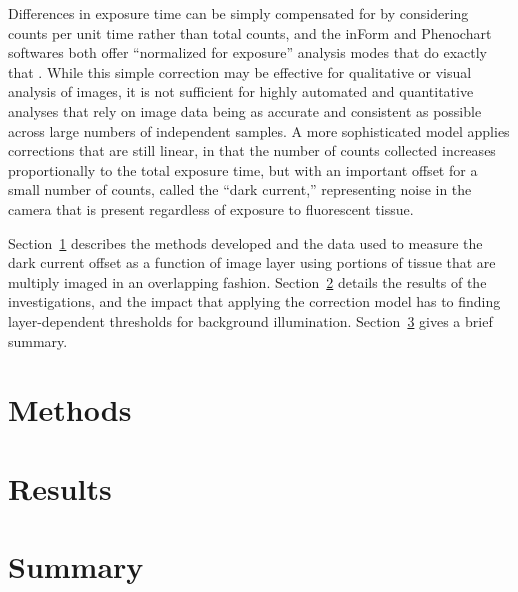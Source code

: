 \documentclass[letterpaper,11pt]{article}
\newcommand{\refsec}[1]{Section~\ref{#1}}
\begin{document}
Differences in exposure time can be simply compensated for by considering counts per unit time rather than total counts, and the inForm and Phenochart softwares both offer ``normalized for exposure'' analysis modes that do exactly that \cite{inform_user_manual,phenochart_user_manual}. While this simple correction may be effective for qualitative or visual analysis of images, it is not sufficient for highly automated and quantitative analyses that rely on image data being as accurate and consistent as possible across large numbers of independent samples. A more sophisticated model applies corrections that are still linear, in that the number of counts collected increases proportionally to the total exposure time, but with an important offset for a small number of counts, called the ``dark current,'' representing noise in the camera that is present regardless of exposure to fluorescent tissue. 

\refsec{sec:methods} describes the methods developed and the data used to measure the dark current offset as a function of image layer using portions of tissue that are multiply imaged in an overlapping fashion. \refsec{sec:results} details the results of the investigations, and the impact that applying the correction model has to finding layer-dependent thresholds for background illumination. \refsec{sec:summary} gives a brief summary.

\section{Methods}
\label{sec:methods}

\section{Results}
\label{sec:results}

\section{Summary}
\label{sec:summary}

\clearpage

\end{document}
